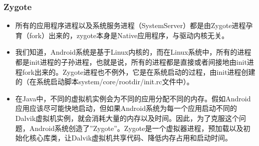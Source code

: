 \documentclass[9pt, b5paper]{article}
\begin{document}
\subsubsection{Zygote}
\label{sec-5-0-4}
\begin{itemize}
\item 所有的应用程序进程以及系统服务进程（SystemServer）都是由Zygote进程孕育（fork）出来的，zygote本身是Native应用程序，与驱动内核无关。
\item 我们知道，Android系统是基于Linux内核的，而在Linux系统中，所有的进程都是init进程的子孙进程，也就是说，所有的进程都是直接或者间接地由init进程fork出来的。Zygote进程也不例外，它是在系统启动的过程，由init进程创建的（在系统启动脚本system/core/rootdir/init.rc文件中）。
\item 在Java中，不同的虚拟机实例会为不同的应用分配不同的内存。假如Android应用应该尽可能快地启动，但如果Android系统为每一个应用启动不同的Dalvik虚拟机实例，就会消耗大量的内存以及时间。因此，为了克服这个问题，Android系统创造了”Zygote”。Zygote是一个虚拟器进程，预加载以及初始化核心库类，让Dalvik虚拟机共享代码、降低内存占用和启动时间。
\end{itemize}
\end{document}
